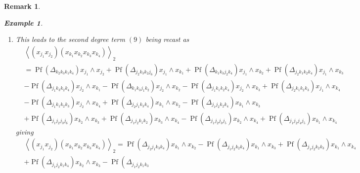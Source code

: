 \documentclass[aps,preprint]{revtex4}%
\newtheorem{example}[theorem]{Example}
\newtheorem{remark}[theorem]{Remark}
\begin{document}
\begin{remark}
\begin{example}
\begin{enumerate}
\item This leads to the \emph{second degree} term $\left(  9\right)  $ being
recast as
\begin{align}
&  \left\langle \left(  x_{j_{1}}x_{j_{2}}\right)  \left(  x_{k_{1}}x_{k_{2}%
}x_{k_{3}}x_{k_{4}}\right)  \right\rangle _{2}\nonumber\\
&  =\operatorname*{Pf}\left(  \Delta_{k_{2}k_{3}k_{1}k_{4}}\right)  x_{j_{1}%
}\wedge x_{j_{2}}+\operatorname*{Pf}\left(  \Delta_{j_{2}k_{3}k_{2}j_{6}%
}\right)  x_{j_{1}}\wedge x_{k_{1}}+\operatorname*{Pf}\left(  \Delta
_{k_{1}k_{3}j_{2}k_{4}}\right)  x_{j_{1}}\wedge x_{k_{2}}+\operatorname*{Pf}%
\left(  \Delta_{j_{2}k_{1}k_{2}k_{4}}\right)  x_{j_{1}}\wedge x_{k_{3}}\\
&  -\operatorname*{Pf}\left(  \Delta_{j_{1}k_{3}k_{2}k_{4}}\right)  x_{j_{2}%
}\wedge x_{k_{1}}-\operatorname*{Pf}\left(  \Delta_{k_{1}k_{3}j_{1}k_{2}%
}\right)  x_{j_{2}}\wedge x_{k_{2}}-\operatorname*{Pf}\left(  \Delta
_{j_{1}k_{1}k_{2}k_{4}}\right)  x_{j_{2}}\wedge x_{k_{3}}+\operatorname*{Pf}%
\left(  \Delta_{j_{2}k_{1}k_{2}k_{3}}\right)  x_{j_{1}}\wedge x_{k_{4}%
}\nonumber\\
&  -\operatorname*{Pf}\left(  \Delta_{j_{1}k_{1}k_{2}k_{3}}\right)  x_{j_{2}%
}\wedge x_{k_{4}}+\operatorname*{Pf}\left(  \Delta_{j_{2}j_{1}k_{3}k_{4}%
}\right)  x_{k_{1}}\wedge x_{k_{2}}-\operatorname*{Pf}\left(  \Delta
_{j_{1}j_{2}k_{2}k_{4}}\right)  x_{k_{1}}\wedge x_{k_{3}}\\
&  +\operatorname*{Pf}\left(  \Delta_{j_{1}j_{2}j_{3}j_{6}}\right)  x_{k_{2}%
}\wedge x_{k_{3}}+\operatorname*{Pf}\left(  \Delta_{j_{1}j_{2}k_{1}k_{2}%
}\right)  x_{k_{3}}\wedge x_{k_{4}}-\operatorname*{Pf}\left(  \Delta
_{j_{1}j_{2}j_{3}j_{5}}\right)  x_{k_{2}}\wedge x_{k_{4}}+\operatorname*{Pf}%
\left(  \Delta_{j_{1}j_{2}j_{4}j_{5}}\right)  x_{k_{1}}\wedge x_{k_{4}}%
\end{align}
giving
\begin{align}
&  \left\langle \left(  x_{j_{1}}x_{j_{2}}\right)  \left(  x_{k_{1}}x_{k_{2}%
}x_{k_{3}}x_{k_{4}}\right)  \right\rangle _{2}=\operatorname*{Pf}\left(
\Delta_{j_{2}j_{1}k_{3}k_{4}}\right)  x_{k_{1}}\wedge x_{k_{2}}%
-\operatorname*{Pf}\left(  \Delta_{j_{1}j_{2}k_{2}k_{4}}\right)  x_{k_{1}%
}\wedge x_{k_{3}}+\operatorname*{Pf}\left(  \Delta_{j_{1}j_{2}k_{2}k_{3}%
}\right)  x_{k_{1}}\wedge x_{k_{4}}\nonumber\\
&  +\operatorname*{Pf}\left(  \Delta_{j_{1}j_{2}k_{1}k_{4}}\right)  x_{k_{2}%
}\wedge x_{k_{3}}-\operatorname*{Pf}\left(  \Delta_{j_{1}j_{2}k_{1}k_{3}%
}
\end{align}
\end{enumerate}
\end{example}
\end{remark}
\end{document}
